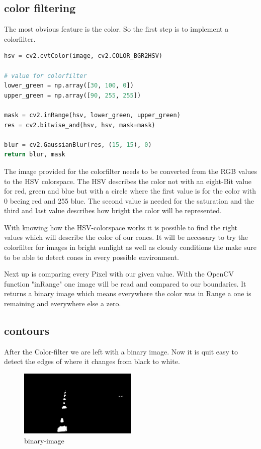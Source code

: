 \documentclass[10pt,a4paper]{article}
\begin{document}
	\subsection{color filtering}
	The most obvious feature is the color. So the first step is to implement a colorfilter.
	\begin{lstlisting}[language=Python]
hsv = cv2.cvtColor(image, cv2.COLOR_BGR2HSV)
	
# value for colorfilter
lower_green = np.array([30, 100, 0])
upper_green = np.array([90, 255, 255])
	
mask = cv2.inRange(hsv, lower_green, upper_green)
res = cv2.bitwise_and(hsv, hsv, mask=mask)

blur = cv2.GaussianBlur(res, (15, 15), 0)
return blur, mask
	\end{lstlisting}
	The image provided for the colorfilter needs to be converted from the RGB values to the HSV colorspace.
	The HSV describes the color not with an eight-Bit value for red, green and blue but with a circle where the first value is for the color with 0 beeing red and 255 blue.
	The second value is needed for the saturation and the third and last value describes how bright the color will be represented.
	
	With knowing how the HSV-colorspace works it is possible to find the right values which will describe the color of our cones. It will be necessary to try the colorfilter for images in bright sunlight as well as cloudy conditions the make sure to be able to detect cones in every possible environment.
	
	Next up is comparing every Pixel with our given value. With the OpenCV function "inRange" one image will be read and compared to our boundaries. It returns a binary image which means everywhere the color was in Range a one is remaining and everywhere else a zero.
	
	\subsection{contours}
	After the Color-filter we are left with a binary image. Now it is quit easy to detect the edges of where it changes from black to white.
	
	\begin{figure}[h]
		\centering
		\includegraphics[width=0.5\textwidth]{Abb/mask.png}
		\caption{binary-image}
		\label{binary-image}
	\end{figure}
	
\end{document}
